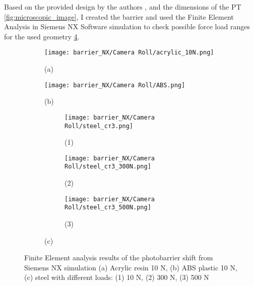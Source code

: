 Based on the provided design by the authors \cite{my_love_pressure_photosensor}, and the dimensions of the PT \ref{fig:microscopic_image}, I created the barrier and used the Finite Element Analysis in Siemens NX Software simulation to check possible force load ranges for the used geometry \ref{fig:different_materials_nx}.

\begin{figure}[H]
  \centering
  \begin{subfigure}[a]{0.4\textwidth}
    \texttt{[image: barrier\_NX/Camera Roll/acrylic\_10N.png]}
    \label{fig:different_materials_nx:acrylic_10N}
    \caption*{(a)}
  \end{subfigure}
  \begin{subfigure}[b]{0.4\textwidth}
    \texttt{[image: barrier\_NX/Camera Roll/ABS.png]}
    \label{fig:different_materials_nx:ABS}
    \caption*{(b)}
  \end{subfigure}
  
  \begin{subfigure}[c]{\textwidth}
    \begin{subfigure}[1]{0.3\textwidth}
      \texttt{[image: barrier\_NX/Camera Roll/steel\_ст3.png]}
      \caption*{(1)}
    \end{subfigure}
    \begin{subfigure}[2]{0.3\textwidth}
      \texttt{[image: barrier\_NX/Camera Roll/steel\_ст3\_300N.png]}
      \caption*{(2)}
    \end{subfigure}
    \begin{subfigure}[3]{0.3\textwidth}
      \texttt{[image: barrier\_NX/Camera Roll/steel\_ст3\_500N.png]}
      \caption*{(3)}
    \end{subfigure}
    \caption*{(c)}
    \label{fig:different_materials_nx:steel}
  \end{subfigure}
  \caption{Finite Element analysis results of the photobarrier shift from Siemens NX simulation (a) Acrylic resin 10 N, (b) ABS plastic 10 N, (c) steel with different loads: (1) 10 N, (2) 300 N, (3) 500 N}
  \label{fig:different_materials_nx}
\end{figure}

